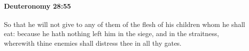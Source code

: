 
		\paragraph{Deuteronomy 28:55} %
			\label{DEUTERONOMY-28-55}

			So that he will not give to any of them of the flesh of his children whom he shall eat: because he hath nothing left him in the siege, and in the straitness, wherewith thine enemies shall distress thee in all thy gates.


